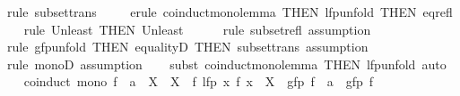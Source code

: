 \begin{isabellebody}
\isamarkupfalse%
\ {\isacharparenleft}{\kern0pt}rule\ subset{\isacharunderscore}{\kern0pt}trans{\isacharparenright}{\kern0pt}\isanewline
\ \ \ \isamarkupfalse%
\ {\isacharparenleft}{\kern0pt}erule\ coinduct{}{\isacharunderscore}{\kern0pt}mono{\isacharunderscore}{\kern0pt}lemma\ {\isacharbrackleft}{\kern0pt}THEN\ lfp{\isacharunderscore}{\kern0pt}unfold\ {\isacharbrackleft}{\kern0pt}THEN\ eq{\isacharunderscore}{\kern0pt}refl{\isacharbrackright}{\kern0pt}{\isacharbrackright}{\kern0pt}{\isacharparenright}{\kern0pt}\isanewline
\ \ \isamarkupfalse%
\ {\isacharparenleft}{\kern0pt}rule\ Un{\isacharunderscore}{\kern0pt}least\ {\isacharbrackleft}{\kern0pt}THEN\ Un{\isacharunderscore}{\kern0pt}least{\isacharbrackright}{\kern0pt}{\isacharparenright}{\kern0pt}\isanewline
\ \ \ \ \isamarkupfalse%
\ {\isacharparenleft}{\kern0pt}rule\ subset{\isacharunderscore}{\kern0pt}refl{\isacharcomma}{\kern0pt}\ assumption{\isacharparenright}{\kern0pt}\isanewline
\ \ \isamarkupfalse%
\ {\isacharparenleft}{\kern0pt}rule\ gfp{\isacharunderscore}{\kern0pt}unfold\ {\isacharbrackleft}{\kern0pt}THEN\ equalityD{}{\isacharcomma}{\kern0pt}\ THEN\ subset{\isacharunderscore}{\kern0pt}trans{\isacharbrackright}{\kern0pt}{\isacharcomma}{\kern0pt}\ assumption{\isacharparenright}{\kern0pt}\isanewline
\ \ \isamarkupfalse%
\ {\isacharparenleft}{\kern0pt}rule\ monoD{\isacharcomma}{\kern0pt}\ assumption{\isacharparenright}{\kern0pt}\isanewline
\ \ \isamarkupfalse%
\ {\isacharparenleft}{\kern0pt}subst\ coinduct{}{\isacharunderscore}{\kern0pt}mono{\isacharunderscore}{\kern0pt}lemma\ {\isacharbrackleft}{\kern0pt}THEN\ lfp{\isacharunderscore}{\kern0pt}unfold{\isacharbrackright}{\kern0pt}{\isacharcomma}{\kern0pt}\ auto{\isacharparenright}{\kern0pt}\isanewline
\ \ \isamarkupfalse%
%
\endisatagproof
{\isafoldproof}%
%
\isadelimproof
\isanewline
%
\endisadelimproof
\isanewline
{}\isamarkupfalse%
\ coinduct{}{\isacharcolon}{\kern0pt}\ {\isachardoublequoteopen}mono\ f\ {\isasymLongrightarrow}\ a\ {\isasymin}\ X\ {\isasymLongrightarrow}\ X\ {\isasymsubseteq}\ f\ {\isacharparenleft}{\kern0pt}lfp\ {\isacharparenleft}{\kern0pt}{\isasymlambda}x{\isachardot}{\kern0pt}\ f\ x\ {\isasymunion}\ X\ {\isasymunion}\ gfp\ f{\isacharparenright}{\kern0pt}{\isacharparenright}{\kern0pt}\ {\isasymLongrightarrow}\ a\ {\isasymin}\ gfp\ f{\isachardoublequoteclose}\isanewline
%
\isadelimproof
\ \ %
\endisadelimproof
%
\isatagproof

\end{isabellebody}
